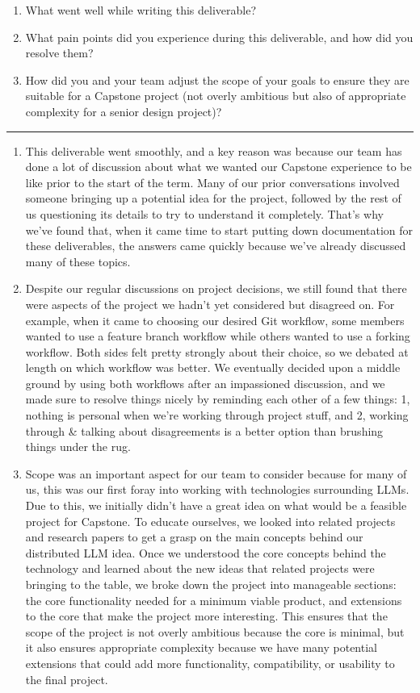\documentclass{article}
\begin{document}
\begin{enumerate}
    \item What went well while writing this deliverable?
    \item What pain points did you experience during this deliverable, and how
    did you resolve them?
    \item How did you and your team adjust the scope of your goals to ensure
    they are suitable for a Capstone project (not overly ambitious but also of
    appropriate complexity for a senior design project)?
\end{enumerate}  
\noindent\rule{\linewidth}{0.4pt}
\begin{enumerate}
    \item This deliverable went smoothly, and a key reason was because our team
has done a lot of discussion about what we wanted our Capstone experience to be
like prior to the start of the term. Many of our prior conversations involved
someone bringing up a potential idea for the project, followed by the rest of us
questioning its details to try to understand it completely. That's why we've found
that, when it came time to start putting down documentation for these deliverables,
the answers came quickly because we've already discussed many of these topics.

    \item Despite our regular discussions on project decisions, we still found
that there were aspects of the project we hadn't yet considered but disagreed on.
For example, when it came to choosing our desired Git workflow, some members wanted to
use a feature branch workflow while others wanted to use a forking workflow. Both
sides felt pretty strongly about their choice, so we debated at length on which workflow
was better. We eventually decided upon a middle ground by using both workflows after
an impassioned discussion, and we made sure to resolve things nicely by reminding each
other of a few things: 1, nothing is personal when we're working through project stuff,
and 2, working through \& talking about disagreements is a better option than brushing
things under the rug.

    \item Scope was an important aspect for our team to consider because for many
of us, this was our first foray into working with technologies surrounding LLMs.
Due to this, we initially didn't have a great idea on what would be a feasible project
for Capstone. To educate ourselves, we looked into related projects and research papers
to get a grasp on the main concepts behind our distributed LLM idea. Once we understood
the core concepts behind the technology and learned about the new ideas that related
projects were bringing to the table, we broke down the project into manageable sections:
the core functionality needed for a minimum viable product, and extensions to the core
that make the project more interesting. This ensures that the scope of the project is not overly
ambitious because the core is minimal, but it also ensures appropriate complexity because
we have many potential extensions that could add more functionality, compatibility, or
usability to the final project.
\end{enumerate}  
\end{document}

